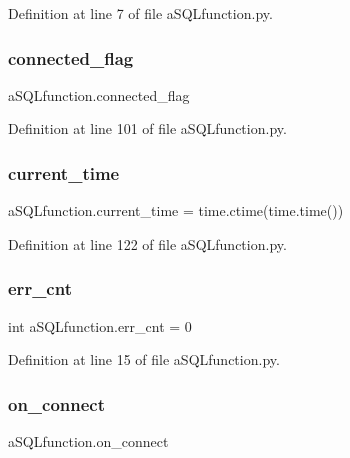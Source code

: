 Definition at line 7 of file a\+S\+Q\+Lfunction.\+py.

\mbox{\label{namespacea_s_q_lfunction_aeaf33b658152029d8f12298efc6ce7b4}} 
\subsubsection{connected\+\_\+flag}
{\footnotesize\ttfamily a\+S\+Q\+Lfunction.\+connected\+\_\+flag}



Definition at line 101 of file a\+S\+Q\+Lfunction.\+py.

\mbox{\label{namespacea_s_q_lfunction_ac3242142d0903ec68fa307f96717b80a}} 
\subsubsection{current\+\_\+time}
{\footnotesize\ttfamily a\+S\+Q\+Lfunction.\+current\+\_\+time = time.\+ctime(time.\+time())}



Definition at line 122 of file a\+S\+Q\+Lfunction.\+py.

\mbox{\label{namespacea_s_q_lfunction_aa3df5e51b14fcdd44b933235dc825c77}} 
\subsubsection{err\+\_\+cnt}
{\footnotesize\ttfamily int a\+S\+Q\+Lfunction.\+err\+\_\+cnt = 0}



Definition at line 15 of file a\+S\+Q\+Lfunction.\+py.

\mbox{\label{namespacea_s_q_lfunction_a679b92b10b4474abfd7266008d35abfd}} 
\subsubsection{on\+\_\+connect}
{\footnotesize\ttfamily a\+S\+Q\+Lfunction.\+on\+\_\+connect}



